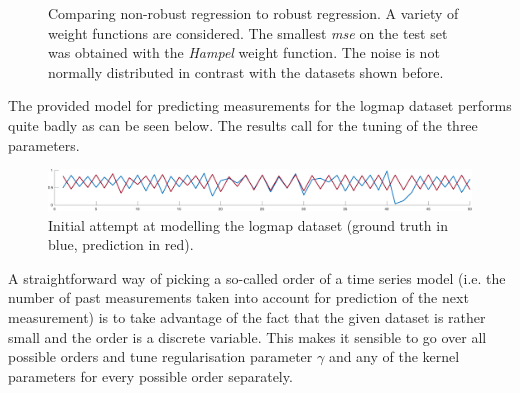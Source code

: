 \begin{figure}[h]
\caption{Comparing non-robust regression to robust regression. A variety of weight functions are considered. The smallest \textit{mse} on the test set was obtained with the \textit{Hampel} weight function. The noise is not normally distributed in contrast with the datasets shown before.}
\label{robustsinc}
\end{figure}



The provided model for predicting measurements for the logmap dataset performs quite badly as can be seen below. The results call for the tuning of the three parameters.

\vspace{0.5cm}
\begin{figure}[!h]
\centering
\includegraphics[width=\textwidth]{../src/figures/logmap/init}
\caption{Initial attempt at modelling the logmap dataset (ground truth in blue, prediction in red).}
\label{logmapinit}
\end{figure}

\par A straightforward way of picking a so-called order of a time series model (i.e. the number of past measurements taken into account for prediction of the next measurement) is to take advantage of the fact that the given dataset is rather small and the order is a discrete variable. This makes it sensible to go over all possible orders and tune regularisation parameter $\gamma$ and any of the kernel parameters for every possible order separately.

